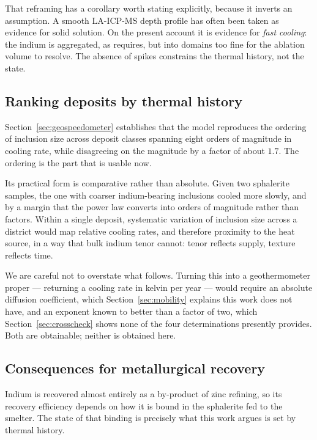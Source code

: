\documentclass[11pt,a4paper]{article}
\begin{document}
That reframing has a corollary worth stating explicitly, because it inverts an
assumption. A smooth LA-ICP-MS depth profile has often been taken as evidence
for solid solution. On the present account it is evidence for \emph{fast
cooling}: the indium is aggregated, as \citet{yu2026b} requires, but into
domains too fine for the ablation volume to resolve. The absence of spikes
constrains the thermal history, not the state.

\subsection{Ranking deposits by thermal history}

Section~\ref{sec:geospeedometer} establishes that the model reproduces the
ordering of inclusion size across deposit classes spanning eight orders of
magnitude in cooling rate, while disagreeing on the magnitude by a factor of
about $1.7$. The ordering is the part that is usable now.

Its practical form is comparative rather than absolute. Given two sphalerite
samples, the one with coarser indium-bearing inclusions cooled more slowly, and
by a margin that the power law converts into orders of magnitude rather than
factors. Within a single deposit, systematic variation of inclusion size across
a district would map relative cooling rates, and therefore proximity to the heat
source, in a way that bulk indium tenor cannot: tenor reflects supply, texture
reflects time.

We are careful not to overstate what follows. Turning this into a
geothermometer proper --- returning a cooling rate in kelvin per year --- would
require an absolute diffusion coefficient, which Section~\ref{sec:mobility}
explains this work does not have, and an exponent known to better than a factor
of two, which Section~\ref{sec:crosscheck} shows none of the four
determinations presently provides. Both are obtainable; neither is obtained
here.

\subsection{Consequences for metallurgical recovery}

Indium is recovered almost entirely as a by-product of zinc refining, so its
recovery efficiency depends on how it is bound in the sphalerite fed to the
smelter. The state of that binding is precisely what this work argues is set by
thermal history.
\end{document}
